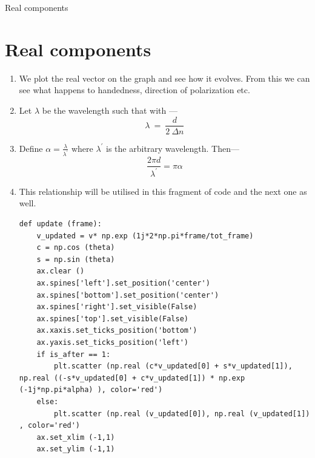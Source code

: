 \documentclass[12pt]{beamer}
\begin{document}
\begin{frame}{Real components}
\section{Real components}
\begin{enumerate}
	\item We plot the real vector on the graph and see how it evolves. From this we can see what happens to handedness, direction of polarization etc.
	\item Let $\lambda$ be the wavelength such that with ---
	$$\lambda\ =\ \frac{d}{2\ \Delta n}$$
	\item Define $\alpha = \frac{\lambda}{\lambda^\prime}$ where $\lambda^\prime$ is the arbitrary wavelength. Then---
	$$\frac{2 \pi d}{\lambda^\prime} = \pi \alpha$$
	\item This relationship will be utilised in this fragment of code and the next one as well.
\begin{lstlisting}
def update (frame):
    v_updated = v* np.exp (1j*2*np.pi*frame/tot_frame)
    c = np.cos (theta)
    s = np.sin (theta)
    ax.clear ()
    ax.spines['left'].set_position('center')
    ax.spines['bottom'].set_position('center')
    ax.spines['right'].set_visible(False)
    ax.spines['top'].set_visible(False)
    ax.xaxis.set_ticks_position('bottom')
    ax.yaxis.set_ticks_position('left')
    if is_after == 1:
        plt.scatter (np.real (c*v_updated[0] + s*v_updated[1]), np.real ((-s*v_updated[0] + c*v_updated[1]) * np.exp (-1j*np.pi*alpha) ), color='red')
    else:
        plt.scatter (np.real (v_updated[0]), np.real (v_updated[1]) , color='red')
    ax.set_xlim (-1,1)
    ax.set_ylim (-1,1)
\end{lstlisting}	
\end{enumerate}
\end{frame}
\end{document}
